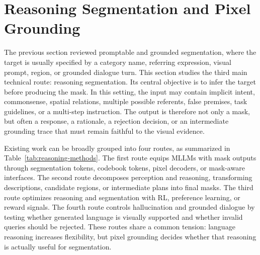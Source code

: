 \section{Reasoning Segmentation and Pixel Grounding}
\label{sec:reasoning-segmentation}

The previous section reviewed promptable and grounded segmentation, where the target is usually specified by a category name, referring expression, visual prompt, region, or grounded dialogue turn. This section studies the third main technical route: reasoning segmentation. Its central objective is to infer the target before producing the mask. In this setting, the input may contain implicit intent, commonsense, spatial relations, multiple possible referents, false premises, task guidelines, or a multi-step instruction. The output is therefore not only a mask, but often a response, a rationale, a rejection decision, or an intermediate grounding trace that must remain faithful to the visual evidence.

Existing work can be broadly grouped into four routes, as summarized in Table~\ref{tab:reasoning-methods}. The first route equips MLLMs with mask outputs through segmentation tokens, codebook tokens, pixel decoders, or mask-aware interfaces. The second route decomposes perception and reasoning, transforming descriptions, candidate regions, or intermediate plans into final masks. The third route optimizes reasoning and segmentation with RL, preference learning, or reward signals. The fourth route controls hallucination and grounded dialogue by testing whether generated language is visually supported and whether invalid queries should be rejected. These routes share a common tension: language reasoning increases flexibility, but pixel grounding decides whether that reasoning is actually useful for segmentation.

